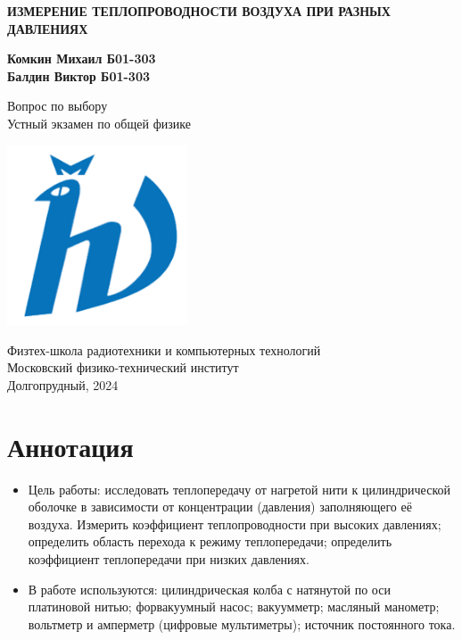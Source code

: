 \documentclass[12pt]{article}
\begin{document}
    \begin{titlepage}
        \begin{center}
            \vspace*{1cm}

            \Huge
            \textbf{ИЗМЕРЕНИЕ ТЕПЛОПРОВОДНОСТИ ВОЗДУХА ПРИ РАЗНЫХ ДАВЛЕНИЯХ}

            \vspace{1.5cm}

            \Large
            \textbf{Комкин Михаил Б01-303\\
                    Балдин Виктор Б01-303}

            \vfill

            Вопрос по выбору \\
            Устный экзамен по общей физике

            \vspace{0.8cm}

            \includegraphics[width=0.4\textwidth]{university_logo.png}

            Физтех-школа радиотехники и компьютерных технологий\\
            Московский физико-технический институт\\
            Долгопрудный, 2024
        \end{center}
    \end{titlepage}

    \tableofcontents

    \section{Аннотация}

    \begin{itemize}
        \item{Цель работы:} исследовать теплопередачу от нагретой нити к цилиндрической оболочке в зависимости от концентрации
        (давления) заполняющего её воздуха. Измерить коэффициент теплопроводности при высоких давлениях; определить область перехода к
        режиму теплопередачи; определить коэффициент теплопередачи при низких давлениях.\\
        \item{В работе используются:} цилиндрическая колба с натянутой по оси платиновой нитью; форвакуумный насос; вакуумметр; масляный манометр; вольтметр и амперметр
        (цифровые мультиметры); источник постоянного тока.
    \end{itemize}
\end{document}
